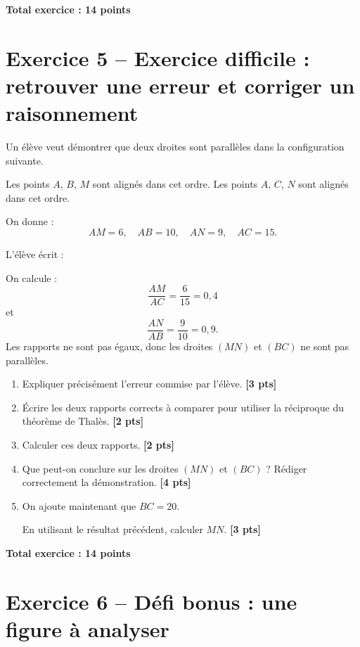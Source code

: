 \documentclass[11pt,a4paper]{article}
\newcommand{\points}[1]{\hfill \textbf{[#1 pts]}}
\newcommand{\totalexo}[1]{\begin{flushright}\textbf{Total exercice : #1 points}\end{flushright}}
\begin{document}
\totalexo{14}

\section*{Exercice 5 -- Exercice difficile : retrouver une erreur et corriger un raisonnement}

Un élève veut démontrer que deux droites sont parallèles dans la configuration suivante.

Les points $A$, $B$, $M$ sont alignés dans cet ordre.  
Les points $A$, $C$, $N$ sont alignés dans cet ordre.

On donne :
\[
AM=6, \quad AB=10, \quad AN=9, \quad AC=15.
\]

L'élève écrit :

\begin{tcolorbox}[colback=gray!5,colframe=black]
On calcule :
\[
\frac{AM}{AC}=\frac{6}{15}=0,4
\]
et
\[
\frac{AN}{AB}=\frac{9}{10}=0,9.
\]
Les rapports ne sont pas égaux, donc les droites $(MN)$ et $(BC)$ ne sont pas parallèles.
\end{tcolorbox}

\begin{enumerate}
    \item Expliquer précisément l'erreur commise par l'élève. \points{3}

    \item Écrire les deux rapports corrects à comparer pour utiliser la réciproque du théorème de Thalès. \points{2}

    \item Calculer ces deux rapports. \points{2}

    \item Que peut-on conclure sur les droites $(MN)$ et $(BC)$ ? Rédiger correctement la démonstration. \points{4}

    \item On ajoute maintenant que $BC=20$.
    
    En utilisant le résultat précédent, calculer $MN$. \points{3}
\end{enumerate}

\totalexo{14}

\section*{Exercice 6 -- Défi bonus : une figure à analyser}
\end{document}
